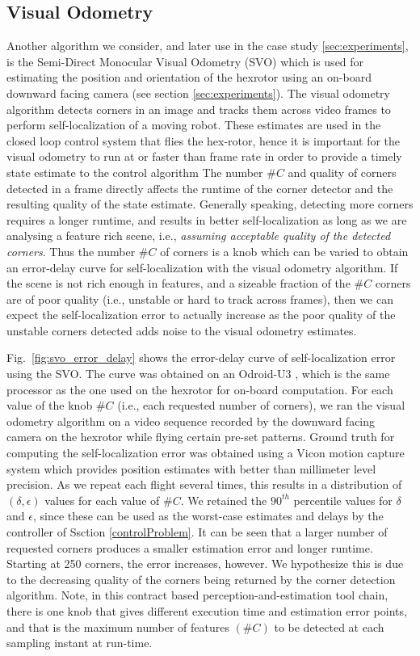 \subsection{Visual Odometry} \label{sec:visual_odometry}

Another algorithm we consider, and later use in the case study \ref{sec:experiments}, is the Semi-Direct Monocular Visual Odometry (SVO) \cite{forster2014svo} which is used for estimating the position and orientation of the hexrotor using an on-board downward facing camera (see section \ref{sec:experiments}).
The visual odometry algorithm detects corners in an image and tracks them across video frames to perform self-localization of a moving robot.
These estimates are used in the closed loop control system that flies the hex-rotor, hence it is important for the visual odometry to run at or faster than frame rate in order to provide a timely state estimate to the control algorithm
The number $\#C$ and quality of corners detected in a frame directly affects the runtime of the corner detector and the resulting quality of the state estimate. Generally speaking, detecting more corners requires a longer runtime, and results in better self-localization as long as we are analysing a feature rich scene, i.e., \emph{assuming acceptable quality of the detected corners}. Thus the number $\#C$ of corners is a knob which can be varied to obtain an error-delay curve for self-localization with the visual odometry algorithm.
If the scene is not rich enough in features, and a sizeable fraction of the $\#C$ corners are of poor quality (i.e., unstable or hard to track across frames), then we can expect the self-localization error to actually increase as the poor quality of the unstable corners detected adds noise to the visual odometry estimates.

Fig.~\ref{fig:svo_error_delay} shows the error-delay curve of self-localization error using the SVO. The curve was obtained on an Odroid-U3 \cite{Odroid}, which is the same processor as the one used on the hexrotor for on-board computation.
For each value of the knob $\#C$ (i.e., each requested number of corners), we ran the visual odometry algorithm on a video sequence recorded by the downward facing camera on the hexrotor while flying certain pre-set patterns.
Ground truth for computing the self-localization error was obtained using a Vicon motion capture system which provides position estimates with better than millimeter level precision.
As we repeat each flight several times, this results in a distribution of $(\delta,\epsilon)$ values for each value of $\#C$.
We retained the $90^{th}$ percentile values for $\delta$ and $\epsilon$, since these can be used as the worst-case estimates and delays by the controller of Ssction \ref{controlProblem}.
It can be seen that a larger number of requested corners produces a smaller estimation error and longer runtime.
Starting at 250 corners, the error increases, however.
We hypothesize this is due to the decreasing quality of the corners being returned by the corner detection algorithm. Note, in this contract based perception-and-estimation tool chain, there is one knob that gives different execution time and estimation error points, and that is the maximum number of features $(\#C)$ to be detected at each sampling instant at run-time.


